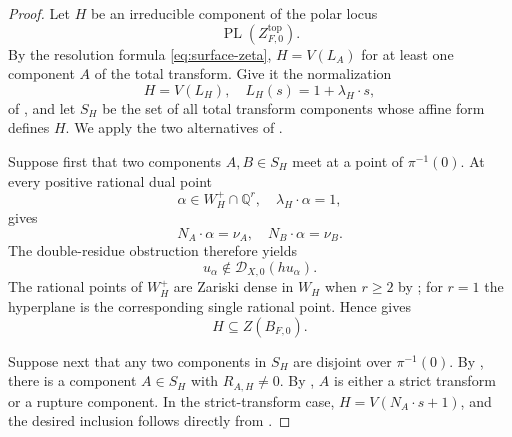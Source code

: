 \documentclass[12pt]{amsart}
\numberwithin{equation}{section}
\theoremstyle{plain}
\theoremstyle{definition}
\theoremstyle{remark}
\theoremstyle{definition}
\DeclareMathOperator{\PL}{PL}
\newcommand{\Q}{\mathbb Q}
\newcommand{\D}{\mathscr D}
\begin{document}
\begin{proof}
Let $H$ be an irreducible component of the polar locus
\begin{equation*}
\PL(Z^{\mathrm{top}}_{F,0}).
\end{equation*}
By the resolution formula \eqref{eq:surface-zeta}, $H=V(L_A)$ for at least one component $A$ of the total transform. Give it the normalization
\begin{equation*}
H=V(L_H),
 \quad
 L_H(s)=1+\lambda_H\cdot s,
\end{equation*}
of , and let $S_H$ be the set of all total transform components whose affine form defines $H$. We apply the two alternatives of .

Suppose first that two components $A,B\in S_H$ meet at a point of $\pi^{-1}(0)$. At every positive rational dual point
\begin{equation*}
\alpha\in W_H^+\cap\Q^r,
 \quad
 \lambda_H\cdot\alpha=1,
\end{equation*}
 gives
\begin{equation*}
N_A\cdot\alpha=\nu_A,
 \quad
 N_B\cdot\alpha=\nu_B.
\end{equation*}
The double-residue obstruction  therefore yields
\begin{equation*}
u_\alpha\notin\D_{X,0}(hu_\alpha).
\end{equation*}
The rational points of $W_H^+$ are Zariski dense in $W_H$ when $r\geq2$ by ; for $r=1$ the hyperplane is the corresponding single rational point. Hence  gives
\begin{equation*}
H\subseteq Z(B_{F,0}).
\end{equation*}

Suppose next that any two components in $S_H$ are disjoint over $\pi^{-1}(0)$. By , there is a component $A\in S_H$ with $R_{A,H}\neq0$. By , $A$ is either a strict transform or a rupture component. In the strict-transform case, $H=V(N_A\cdot s+1)$, and the desired inclusion follows directly from .


\end{proof}
\end{document}
